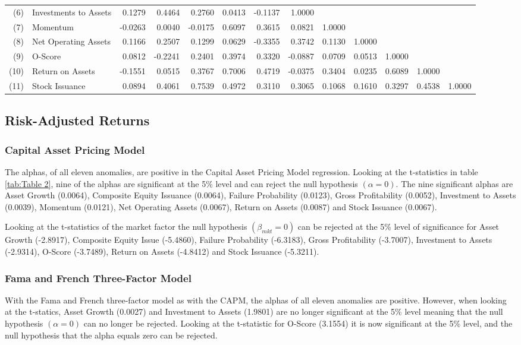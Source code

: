 \documentclass[a4paper]{article}                 %
\begin{document}
\begin{table}[hbt]
{\begin{tabular}{@{}rlrrrrrrrrrrr@{}}
(6) & Investments to Assets & 0.1279 & 0.4464 & 0.2760 & 0.0413 & -0.1137 & 1.0000 &  &  &  &  &  \\
(7) & Momentum & -0.0263 & 0.0040 & -0.0175 & 0.6097 & 0.3615 & 0.0821 & 1.0000 &  &  &  &  \\
(8) & Net Operating Assets & 0.1166 & 0.2507 & 0.1299 & 0.0629 & -0.3355 & 0.3742 & 0.1130 & 1.0000 &  &  &  \\
(9) & O-Score & 0.0812 & -0.2241 & 0.2401 & 0.3974 & 0.3320 & -0.0887 & 0.0709 & 0.0513 & 1.0000 &  &  \\
(10) & Return on Assets & -0.1551 & 0.0515 & 0.3767 & 0.7006 & 0.4719 & -0.0375 & 0.3404 & 0.0235 & 0.6089 & 1.0000 &  \\
(11) & Stock Issuance & 0.0894 & 0.4061 & 0.7539 & 0.4972 & 0.3110 & 0.3065 & 0.1068 & 0.1610 & 0.3297 & 0.4538 & 1.0000 \\ \bottomrule
\end{tabular}%
}
\end{table}

\subsection{Risk-Adjusted Returns}
\subsubsection{Capital Asset Pricing Model}
The alphas, of all eleven anomalies, are positive in the Capital Asset Pricing Model regression. Looking at the t-statistics in table \ref{tab:Table 2}, nine of the alphas are significant at the 5\% level and can reject the null hypothesis $(\alpha=0)$. The nine significant alphas are Asset Growth (0.0064), Composite Equity Issuance (0.0064), Failure Probability (0.0123), Gross Profitability (0.0052), Investment to Assets (0.0039), Momentum (0.0121), Net Operating Assets (0.0067), Return on Assets (0.0087) and Stock Issuance (0.0067).

Looking at the t-statistics of the market factor the null hypothesis $(\beta_{mkt}= 0)$ can be rejected at the 5\% level of significance for Asset Growth (-2.8917), Composite Equity Issue (-5.4860), Failure Probability (-6.3183), Gross Profitability (-3.7007), Investment to Assets (-2.9314), O-Score (-3.7489), Return on Assets (-4.8412) and Stock Issuance (-5.3211). 

\subsubsection{Fama and French Three-Factor Model}
With the Fama and French three-factor model as with the CAPM, the alphas of all eleven anomalies are positive. However, when looking at the t-statics, Asset Growth (0.0027) and Investment to Assets (1.9801) are no longer significant at the 5\% level meaning that the null hypothesis $(\alpha=0)$ can no longer be rejected. Looking at the t-statistic for O-Score (3.1554) it is now significant at the 5\% level, and the null hypothesis that the alpha equals zero can be rejected. 
\end{document}
